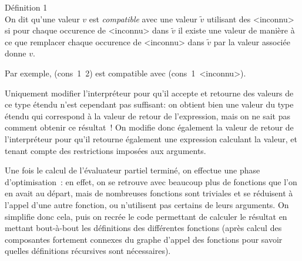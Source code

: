 \documentclass[a4paper,11pt]{article}
\newcommand{\code}[1]{{\fontfamily{pcr}\selectfont #1}}
\begin{document}
\begin{framed}
{\noindent \Large Définition 1} \\
\indent On dit qu'une valeur $v$ est \emph{compatible} avec une
valeur $\tilde{v}$ utilisant des \code{<inconnu>} si pour chaque
occurence de \code{<inconnu>} dans $\tilde{v}$ il existe une valeur
de manière à ce que remplacer chaque occurence de \code{<inconnu>}
dans $\tilde{v}$ par la valeur associée donne $v$.

Par exemple, \code{(cons~1~2)} est compatible avec \code{(cons~1~<inconnu>)}.
\end{framed}

Uniquement modifier l'interpréteur pour qu'il accepte et retourne des
valeurs de ce type étendu n'est cependant pas suffisant: on obtient
bien une valeur du type étendu qui correspond à la valeur de retour de
l'expression, mais on ne sait pas comment obtenir ce résultat~! On
modifie donc également la valeur de retour de l'interpréteur pour
qu'il retourne également une expression calculant la valeur, et tenant
compte des restrictions imposées aux arguments.

\begin{comment}
On obtient donc le pseudo-code suivant, très proche de celui de
l'interpréteur (il est ici écourté) :

\begin{lstlisting}
specialiser(expression, environnement)
  Si expression est une constante:
    retourner (expression, expression)
  Si expression est une variable:
    retourner (trouver_variable(environnement, expression),
                   expression)
  Si expression est une instruction conditionnelle:
    (resultat_test, code_test) =
        specialiser(test(expression), environnement)
    Si resultat_test est connu:
        Si resultat_test:
          retourner specialiser(si_vrai(expression),
                                environnement)
        Sinon:
          retourner specialiser(si_faux(expression),
                                environnement)
    Sinon:
       (valeur1, code1) =
           specialiser(si_vrai(expression), environnement)
       (valeur2, code2) =
           specialiser(si_faux(expression), environnement)
       retourner (fusion_valeurs(valeur1, valeur2),
                    creer_test(code_test, code1, code2))
  etc.
\end{lstlisting}
\end{comment}

Une fois le calcul de l'évaluateur partiel terminé, on effectue une
phase d'optimisation~: en effet, on se retrouve avec beaucoup plus de
fonctions que l'on en avait au départ, mais de nombreuses fonctions
sont triviales et se réduisent à l'appel d'une autre fonction, ou
n'utilisent pas certains de leurs arguments. On simplifie donc cela,
puis on recrée le code permettant de calculer le résultat en mettant
bout-à-bout les définitions des différentes fonctions (après calcul
des composantes fortement connexes du graphe d'appel des fonctions
pour savoir quelles définitions récursives sont nécessaires).
\end{document}
